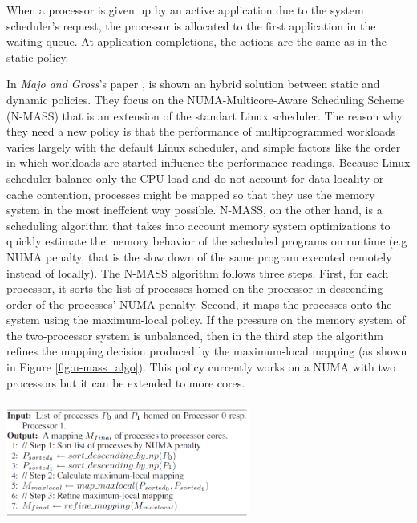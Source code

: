 \documentclass[a4paper,10pt]{article}
\makeatletter
\newenvironment{figurehere}{\def\@captype{figure}\vspace{2ex}}{\vspace{2ex}}
\makeatother
\begin{document}
\begin{multicols}{2}
When a processor is given up by an active application due to the system scheduler's request, the processor is allocated to the first application in the waiting queue. At application completions, the actions are the same as in the static policy.\par
\parindent 10mm In \emph{Majo and Gross}'s paper \cite{Majo_memorymanagement}, is shown an hybrid solution between static and dynamic policies. They focus on the NUMA-Multicore-Aware Scheduling Scheme (N-MASS) that is an extension of the standart Linux scheduler. The reason why they need a new policy is that the performance of multiprogrammed workloads varies largely with the default Linux scheduler, and simple factors like the order in which workloads are started influence the performance readings. Because Linux scheduler balance only the CPU load and do not account for data locality or cache contention, processes might be mapped so that they use the memory system in the most ineffcient way possible. N-MASS, on the other hand, is a scheduling algorithm that takes into account memory system optimizations to quickly estimate the memory behavior of the scheduled programs on runtime (e.g NUMA penalty, that is the slow down of the same program executed remotely instead of locally). The N-MASS algorithm follows three steps. First, for each processor, it sorts the list of processes homed on the processor in descending order of the processes' NUMA penalty. Second, it maps the processes onto the system using the maximum-local policy. If the pressure on the memory system of the two-processor system is unbalanced, then in the third step the algorithm refines the mapping decision produced by the maximum-local mapping (as shown in Figure \ref{fig:n-mass_algo}).
This policy currently works on a NUMA with two processors but it can be extended to more cores.

\begin{figurehere}
 \centering
 \includegraphics[width=8cm, height=4cm]{./eps/n-mass_algo.png}
 \caption{N-MASS: maps n processes onto a 2-processor NUMA-multicore system}
 \label{fig:n-mass_algo}
\end{figurehere}


\end{multicols}
\end{document}
